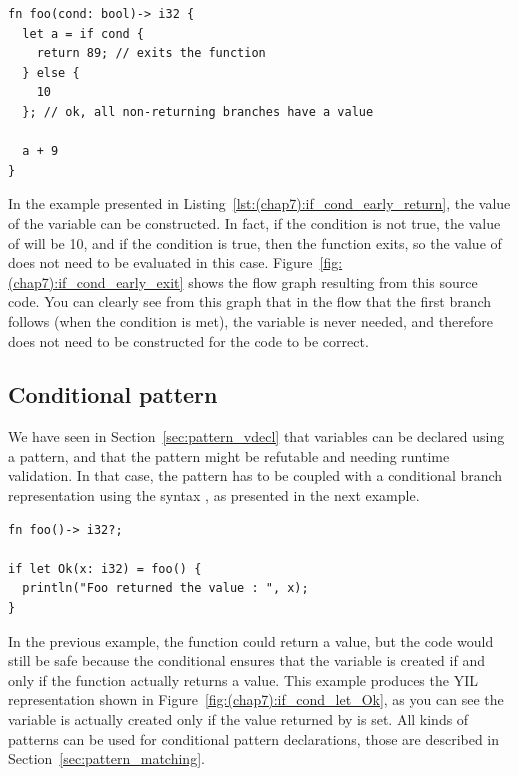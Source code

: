 


\begin{lstlisting}[style=coloredverbatim, caption=Early return in \token{if} condition, label=lst:(chap7):if_cond_early_return]
fn foo(cond: bool)-> i32 {
  let a = if cond {
    return 89; // exits the function
  } else {
    10
  }; // ok, all non-returning branches have a value

  a + 9
}
\end{lstlisting}

In the example presented in Listing~\ref{lst:(chap7):if_cond_early_return}, the value of
the variable  can be constructed. In fact, if the condition is not
true, the value of  will be 10, and if the condition is true, then the
function exits, so the value of  does not need to be evaluated in this
case. Figure~\ref{fig:(chap7):if_cond_early_exit} shows the flow graph resulting from
this source code. You can clearly see from this graph that in the flow that the
first branch follows (when the condition is met), the variable  is
never needed, and therefore does not need to be constructed for the code to be
correct.


\subsection {Conditional pattern}
\label{sec:cond_pattern}

We have seen in Section~\ref{sec:pattern_vdecl} that variables can be declared
using a pattern, and that the pattern might be refutable and needing runtime
validation. In that case, the pattern has to be coupled with a conditional
branch representation using the syntax , as
presented in the next example.



\begin{lstlisting}[style=coloredverbatim, label=lst:(chap7):if_cond_let_Ok, caption=Example of conditional pattern]
fn foo()-> i32?;

if let Ok(x: i32) = foo() {
  println("Foo returned the value : ", x);
}
\end{lstlisting}

In the previous example, the function  could return a 
value, but the code would still be safe because the conditional ensures that the
variable  is created if and only if the function actually returns a
value. This example produces the YIL representation shown in
Figure~\ref{fig:(chap7):if_cond_let_Ok}, as you can see the variable  is
actually created only if the value returned by  is set. All kinds of
patterns can be used for conditional pattern declarations, those are described
in Section~\ref{sec:pattern_matching}.



